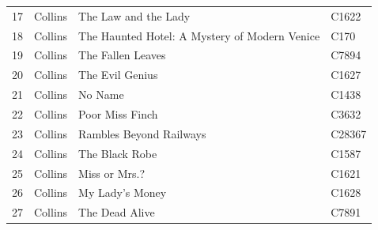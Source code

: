 \documentclass[a4paper,10pt,twoside,fleqn]{article}
\begin{document}
\begin{table}[!htb]
\begin{minipage}{.55\linewidth}
\begin{tabular}{c l l l }
17		& Collins			& The Law and the Lady		& C1622         \\
18		& Collins			& The Haunted Hotel: A Mystery of Modern Venice	&    C170              \\
19		& Collins			& The Fallen Leaves		& C7894           \\
20		& Collins			& The Evil Genius		& C1627           \\
21		& Collins			& No Name			& C1438        \\
22		& Collins			& Poor Miss Finch		& C3632           \\
23		& Collins			& Rambles Beyond Railways	& C28367         \\
24		& Collins			& The Black Robe		& C1587      \\
25		& Collins			& Miss or Mrs.?			& C1621          \\
26		& Collins			& My Lady's Money		& C1628         \\
27		& Collins			& The Dead Alive		& C7891        \\
\bottomrule
\end{tabular}

    \end{minipage} 
\end{table}
\end{document}

